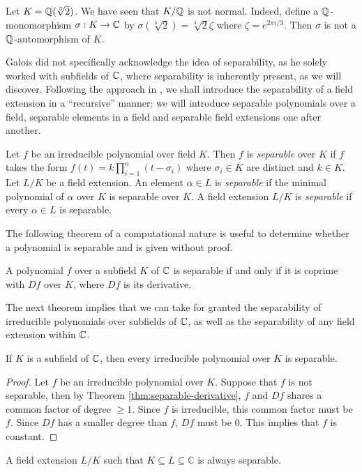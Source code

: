 \begin{example}
	Let $K = \mathbb Q(\sqrt[3]{2})$. We have seen that $K / \mathbb Q$ is not normal. Indeed, define a $\mathbb Q$-monomorphism $\sigma : K \to \mathbb C$ by $\sigma(\sqrt[3]{2}) =  \sqrt[3]{2}\zeta $ where $\zeta = e^{2 \pi i / 3}$. Then $\sigma$ is not a $\mathbb Q$-automorphism of $K$. 
\end{example}



Galois did not specifically acknowledge the idea of separability, as he solely worked with subfields of $\mathbb C$, where separability is inherently present, as we will discover. Following the approach in \cite{Stewart}, we shall introduce the separability of a field extension in a ``recursive'' manner: we will introduce separable polynomials over a field, separable elements in a field and separable field extensions one after another. 

\begin{definition}
    Let $f$ be an irreducible polynomial over field $K$. Then $f$ is \textit{separable} over $K$ if $f$ takes the form 
    $
        f(t) = k \prod_{i = 1} ^ n(t - \sigma_i)
    $
    where $\sigma_i \in \overline K$ are distinct and $k \in K$.
    Let $L/K$ be a field extension. An element $\alpha \in L$ is \textit{separable} if the minimal polynomial of $\alpha$ over $K$ is separable over $K$.
    A field extension $L / K$ is \textit{separable} if every $\alpha \in L$ is separable.
\end{definition}

The following theorem of a computational nature is useful to determine whether a polynomial is separable and is given without proof. 

\begin{theorem} \label{thm:separable-derivative}
    A polynomial $f$ over a subfield $K$ of  $\mathbb C$ is separable if and only if it is coprime with $Df$ over $K$, where $Df$ is its derivative. 
\end{theorem}

The next theorem implies that we can take for granted the separability of irreducible polynomials over subfields of $\mathbb C$, as well as the separability of any field extension within $\mathbb C$.


\begin{theorem} \label{thm:separable-poly-in-C}
    If $K$ is a subfield of $\mathbb C$, then every irreducible polynomial over $K$ is separable. 
\end{theorem}

\begin{proof}
    Let $f$ be an irreducible polynomial over $K$. Suppose that $f$ is not separable, then by Theorem \ref{thm:separable-derivative}, $f$ and $Df$ shares a common factor of degree $\ge 1$. Since $f$ is irreducible, this common factor must be $f$. Since $Df$ has a smaller degree than $f$, $Df$ must be $0$. This implies that $f$ is constant.
\end{proof}


\begin{corollary} \label{thm:separable-extension-in-C}
    A field extension $L/K$ such that $K \subseteq L \subseteq \mathbb C$ is always separable. 
\end{corollary}


